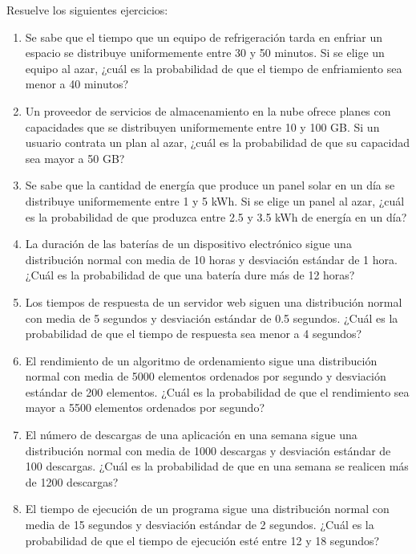 \begin{Ejer}
Resuelve los siguientes ejercicios:
\begin{enumerate}

    \item Se sabe que el tiempo que un equipo de refrigeración tarda en enfriar un espacio se distribuye uniformemente entre 30 y 50 minutos. Si se elige un equipo al azar, ¿cuál es la probabilidad de que el tiempo de enfriamiento sea menor a 40 minutos?

    \item Un proveedor de servicios de almacenamiento en la nube ofrece planes con capacidades que se distribuyen uniformemente entre 10 y 100 GB. Si un usuario contrata un plan al azar, ¿cuál es la probabilidad de que su capacidad sea mayor a 50 GB?

    \item Se sabe que la cantidad de energía que produce un panel solar en un día se distribuye uniformemente entre 1 y 5 kWh. Si se elige un panel al azar, ¿cuál es la probabilidad de que produzca entre 2.5 y 3.5 kWh de energía en un día?
    \item La duración de las baterías de un dispositivo electrónico sigue una distribución normal con media de 10 horas y desviación estándar de 1 hora. ¿Cuál es la probabilidad de que una batería dure más de 12 horas?

    \item Los tiempos de respuesta de un servidor web siguen una distribución normal con media de 5 segundos y desviación estándar de 0.5 segundos. ¿Cuál es la probabilidad de que el tiempo de respuesta sea menor a 4 segundos?

    \item El rendimiento de un algoritmo de ordenamiento sigue una distribución normal con media de 5000 elementos ordenados por segundo y desviación estándar de 200 elementos. ¿Cuál es la probabilidad de que el rendimiento sea mayor a 5500 elementos ordenados por segundo?

    \item El número de descargas de una aplicación en una semana sigue una distribución normal con media de 1000 descargas y desviación estándar de 100 descargas. ¿Cuál es la probabilidad de que en una semana se realicen más de 1200 descargas?

    \item El tiempo de ejecución de un programa sigue una distribución normal con media de 15 segundos y desviación estándar de 2 segundos. ¿Cuál es la probabilidad de que el tiempo de ejecución esté entre 12 y 18 segundos?


\end{enumerate}
\end{Ejer}
